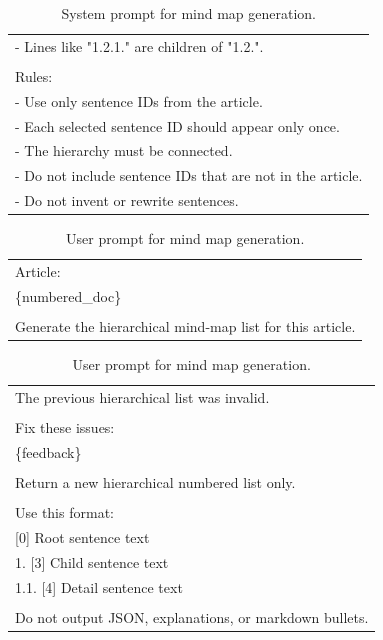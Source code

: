 \documentclass{article}
\begin{document}
\begin{table}[!tbh]
\begin{tabular}{|l|}
- Lines like "1.2.1." are children of "1.2.".\\
\\
Rules:\\
- Use only sentence IDs from the article.\\
- Each selected sentence ID should appear only once.\\
- The hierarchy must be connected.\\
- Do not include sentence IDs that are not in the article.\\
- Do not invent or rewrite sentences.\\
\hline
    \end{tabular}
    \caption{System prompt for mind map generation.}
    \label{tab:system_prompt}
\end{table}

\begin{table}[!tbh]
    \centering
    \begin{tabular}{|l|}
\hline
Article:\\
\{numbered\_doc\}\\
\\
Generate the hierarchical mind-map list for this article.\\
\hline
    \end{tabular}
    \caption{User prompt for mind map generation.}
    \label{tab:user_prompt}
\end{table}

\begin{table}[!tbh]
    \centering
    \begin{tabular}{|l|}
\hline
The previous hierarchical list was invalid.\\
\\
Fix these issues:\\
\{feedback\}\\
\\
Return a new hierarchical numbered list only.\\
\\
Use this format:\\
{[0]} Root sentence text\\
1. [3] Child sentence text\\
1.1. [4] Detail sentence text\\
\\
Do not output JSON, explanations, or markdown bullets.\\
\hline
    \end{tabular}
    \caption{User prompt for mind map generation.}
    \label{tab:user_prompt}
\end{table}
\end{document}
